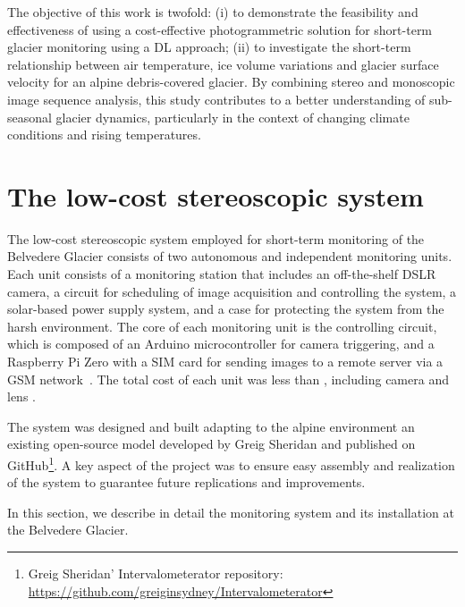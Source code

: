 The objective of this work is twofold:
(i) to demonstrate the feasibility and effectiveness of using a cost-effective
photogrammetric solution for short-term glacier monitoring using a DL approach;
(ii) to investigate the short-term relationship between air temperature, ice volume
variations and glacier surface velocity for an alpine debris-covered glacier.
By combining stereo and monoscopic image sequence analysis, this study
contributes to a better understanding of sub-seasonal glacier dynamics,
particularly in the context of changing climate conditions and rising temperatures.

\section{The low-cost stereoscopic system}\label{sec:4:system}

The low-cost stereoscopic system employed for short-term monitoring of the Belvedere Glacier consists of two autonomous and independent monitoring units. 
Each unit consists of a monitoring station that includes an off-the-shelf DSLR camera, a circuit for scheduling of image acquisition and controlling the system, a solar-based power supply system, and a case for protecting the system from the harsh environment. 
The core of each monitoring unit is the controlling circuit, which is composed of an Arduino microcontroller for camera triggering, and a Raspberry Pi Zero with a SIM card for sending images to a remote server via a GSM network~.
The total cost of each unit was less than , including camera and lens \citep{ioli2023_replicable}.

The system was designed and built adapting to the alpine environment an existing
open-source model developed by Greig Sheridan and published on
GitHub\footnote{\label{foot:greig}Greig Sheridan' Intervalometerator repository:
  \url{https://github.com/greiginsydney/Intervalometerator}}.
A key aspect of the project was to ensure easy assembly and realization of the system to
guarantee future replications and improvements.

In this section, we describe in detail the monitoring system and its installation at the Belvedere Glacier.

